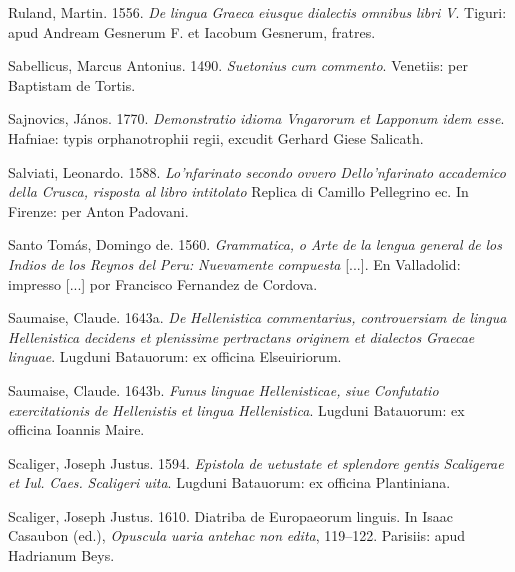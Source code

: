 \documentclass[output=paper]{langsci/langscibook}
\begin{document}
Ruland, Martin. 1556. \textit{De} \textit{lingua} \textit{Graeca} \textit{eiusque} \textit{dialectis} \textit{omnibus} \textit{libri} \textit{V}. Tiguri: apud Andream Gesnerum F. et Iacobum Gesnerum, fratres.

Sabellicus, Marcus Antonius. 1490. \textit{Suetonius} \textit{cum} \textit{commento}. Venetiis: per Baptistam de Tortis.

Sajnovics, János. 1770. \textit{Demonstratio} \textit{idioma} \textit{Vngarorum} \textit{et} \textit{Lapponum} \textit{idem} \textit{esse}. Hafniae: typis orphanotrophii regii, excudit Gerhard Giese Salicath.

Salviati, Leonardo. 1588. \textit{Lo’nfarinato} \textit{secondo} \textit{ovvero} \textit{Dello’nfarinato} \textit{accademico} \textit{della} \textit{Crusca,} \textit{risposta} \textit{al} \textit{libro} \textit{intitolato} Replica di Camillo Pellegrino ec. In Firenze: per Anton Padovani.

Santo Tomás, Domingo de. 1560. \textit{Grammatica,} \textit{o} \textit{Arte} \textit{de} \textit{la} \textit{lengua} \textit{general} \textit{de} \textit{los} \textit{Indios} \textit{de} \textit{los} \textit{Reynos} \textit{del} \textit{Peru:} \textit{Nuevamente} \textit{compuesta} [...]. En Valladolid: impresso [...] por Francisco Fernandez de Cordova.

Saumaise, Claude. 1643a. \textit{De} \textit{Hellenistica} \textit{commentarius,} \textit{controuersiam} \textit{de} \textit{lingua} \textit{Hellenistica} \textit{decidens} \textit{et} \textit{plenissime} \textit{pertractans} \textit{originem} \textit{et} \textit{dialectos} \textit{Graecae} \textit{linguae}. Lugduni Batauorum: ex officina Elseuiriorum.

Saumaise, Claude. 1643b. \textit{Funus} \textit{linguae} \textit{Hellenisticae,} \textit{siue} \textit{Confutatio} \textit{exercitationis} \textit{de} \textit{Hellenistis} \textit{et} \textit{lingua} \textit{Hellenistica}. Lugduni Batauorum: ex officina Ioannis Maire.

Scaliger, Joseph Justus. 1594. \textit{Epistola} \textit{de} \textit{uetustate} \textit{et} \textit{splendore} \textit{gentis} \textit{Scaligerae} \textit{et} \textit{Iul.} \textit{Caes.} \textit{Scaligeri} \textit{uita}. Lugduni Batauorum: ex officina Plantiniana.

Scaliger, Joseph Justus. 1610. Diatriba de Europaeorum linguis. In Isaac Casaubon (ed.), \textit{Opuscula} \textit{uaria} \textit{antehac} \textit{non} \textit{edita}, 119–122. Parisiis: apud Hadrianum Beys.
\end{document}
